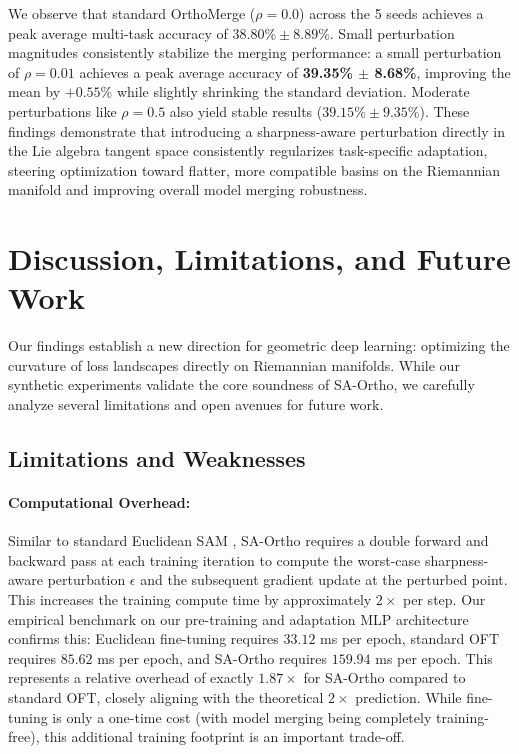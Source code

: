 \documentclass{article}
\theoremstyle{plain}
\theoremstyle{definition}
\theoremstyle{remark}
\begin{document}
We observe that standard OrthoMerge ($\rho=0.0$) across the 5 seeds achieves a peak average multi-task accuracy of $38.80\% \pm 8.89\%$. Small perturbation magnitudes consistently stabilize the merging performance: a small perturbation of $\rho = 0.01$ achieves a peak average accuracy of \textbf{39.35\% $\pm$ 8.68\%}, improving the mean by $+0.55\%$ while slightly shrinking the standard deviation. Moderate perturbations like $\rho = 0.5$ also yield stable results ($39.15\% \pm 9.35\%$). These findings demonstrate that introducing a sharpness-aware perturbation directly in the Lie algebra tangent space consistently regularizes task-specific adaptation, steering optimization toward flatter, more compatible basins on the Riemannian manifold and improving overall model merging robustness.

\section{Discussion, Limitations, and Future Work}
\label{submission-discussion}

Our findings establish a new direction for geometric deep learning: optimizing the curvature of loss landscapes directly on Riemannian manifolds. While our synthetic experiments validate the core soundness of SA-Ortho, we carefully analyze several limitations and open avenues for future work.

\subsection{Limitations and Weaknesses}
\paragraph{Computational Overhead:} Similar to standard Euclidean SAM \cite{foret2021sharpness}, SA-Ortho requires a double forward and backward pass at each training iteration to compute the worst-case sharpness-aware perturbation $\epsilon$ and the subsequent gradient update at the perturbed point. This increases the training compute time by approximately $2\times$ per step. Our empirical benchmark on our pre-training and adaptation MLP architecture confirms this: Euclidean fine-tuning requires $33.12$ ms per epoch, standard OFT requires $85.62$ ms per epoch, and SA-Ortho requires $159.94$ ms per epoch. This represents a relative overhead of exactly $1.87\times$ for SA-Ortho compared to standard OFT, closely aligning with the theoretical $2\times$ prediction. While fine-tuning is only a one-time cost (with model merging being completely training-free), this additional training footprint is an important trade-off.
\end{document}
